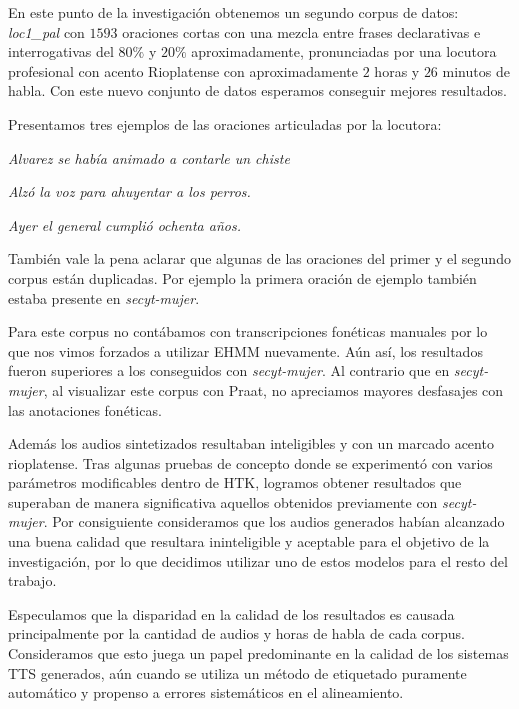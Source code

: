 En este punto de la investigación obtenemos un segundo corpus de datos: \textit{loc1\_pal} \cite{loc1pal} con $1593$ oraciones cortas con una mezcla entre frases declarativas e interrogativas del $80\%$ y $20\%$ aproximadamente, pronunciadas por una locutora profesional con acento Rioplatense con aproximadamente $2$ horas y $26$ minutos de habla. Con este nuevo conjunto de datos esperamos conseguir mejores resultados.

Presentamos tres ejemplos de las oraciones articuladas por la locutora:

\indent\indent \textit{Alvarez se había animado a contarle un chiste}

\indent\indent \textit{Alzó la voz para ahuyentar a los perros.}

\indent\indent \textit{Ayer el general cumplió ochenta años.}

También vale la pena aclarar que algunas de las oraciones del primer y el segundo corpus están duplicadas. Por ejemplo la primera oración de ejemplo también estaba presente en \textit{secyt-mujer}.

Para este corpus no contábamos con transcripciones fonéticas manuales por lo que nos vimos forzados a utilizar EHMM nuevamente. Aún así, los resultados fueron superiores a los conseguidos con \textit{secyt-mujer}. Al contrario que en \textit{secyt-mujer}, al visualizar este corpus con Praat, no apreciamos mayores desfasajes con las anotaciones fonéticas.

Además los audios sintetizados resultaban inteligibles y con un marcado acento rioplatense. Tras algunas pruebas de concepto donde se experimentó con varios parámetros modificables dentro de HTK, logramos obtener resultados que superaban de manera significativa aquellos obtenidos previamente con \textit{secyt-mujer}. Por consiguiente consideramos que los audios generados habían alcanzado una buena calidad que resultara ininteligible y aceptable para el objetivo de la investigación, por lo que decidimos utilizar uno de estos modelos para el resto del trabajo.


Especulamos que la disparidad en la calidad de los resultados es causada principalmente por la cantidad de audios y horas de habla de cada corpus\cite{whyItSucked}. Consideramos que esto juega un papel predominante en la calidad de los sistemas TTS generados, aún cuando se utiliza un método de etiquetado puramente automático y propenso a errores sistemáticos en el alineamiento.

